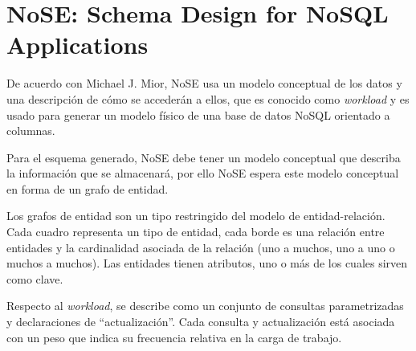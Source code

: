 \section{NoSE: Schema Design for NoSQL Applications}
De acuerdo con Michael J. Mior\cite{mior_nose_2017}, NoSE usa un modelo conceptual de los datos y una descripción de cómo se accederán a ellos, que es conocido como \textit{workload} y es usado para generar un modelo físico de una base de datos NoSQL orientado a columnas.


Para el esquema generado, NoSE debe tener un modelo conceptual que describa la información que se almacenará, por ello NoSE espera este modelo conceptual en forma de un grafo de entidad.


Los grafos de entidad son un tipo restringido del modelo de entidad-relación. Cada cuadro representa un tipo de entidad, cada borde es una relación entre entidades y la cardinalidad asociada de la relación (uno a muchos, uno a uno o muchos a muchos). Las entidades tienen atributos, uno o más de los cuales sirven como clave. 


Respecto al \textit{workload}, se describe como un conjunto de consultas parametrizadas y declaraciones de ``actualización''. Cada consulta y actualización está asociada con un peso que indica su frecuencia relativa en la carga de trabajo.